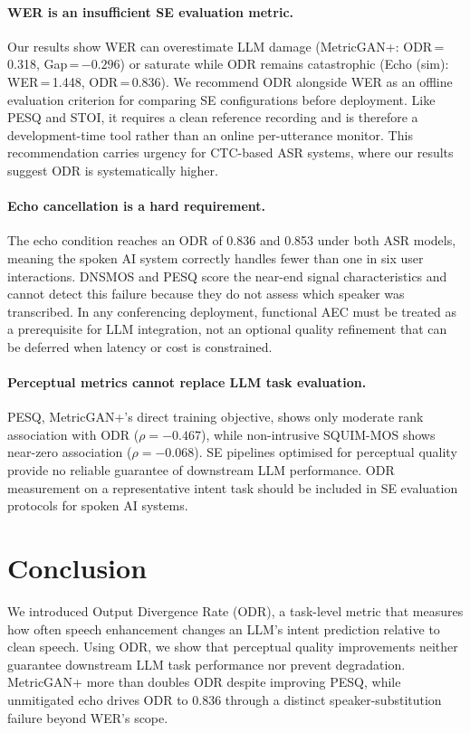 \documentclass[11pt]{article}
\begin{document}
\paragraph{WER is an insufficient SE evaluation metric.}
Our results show WER can overestimate LLM damage (MetricGAN{+}:
ODR\,=\,0.318, Gap\,=\,$-0.296$) or saturate while
ODR remains catastrophic (Echo (sim): WER\,=\,1.448,
ODR\,=\,0.836).
We recommend ODR alongside WER as an offline evaluation criterion
for comparing SE configurations before deployment. Like PESQ and
STOI, it requires a clean reference recording and is therefore
a development-time tool rather than an online per-utterance monitor.
This recommendation carries urgency for CTC-based ASR
systems, where our results suggest ODR is systematically higher.
 
\paragraph{Echo cancellation is a hard requirement.}
The echo condition reaches an ODR of 0.836 and 0.853 under both ASR
models, meaning the spoken AI system correctly handles fewer than one in six
user interactions.
DNSMOS and PESQ score the near-end signal characteristics and cannot
detect this failure because they do not assess which speaker was
transcribed.
In any conferencing deployment, functional AEC must be treated as a
prerequisite for LLM integration, not an optional quality refinement
that can be deferred when latency or cost is constrained.

\paragraph{Perceptual metrics cannot replace LLM task evaluation.}
PESQ, MetricGAN{+}'s direct training objective, shows only moderate
rank association with ODR ($\rho = -0.467$), while non-intrusive
SQUIM-MOS shows near-zero association ($\rho = -0.068$).
SE pipelines optimised for perceptual quality provide no reliable
guarantee of downstream LLM performance. ODR measurement on a
representative intent task should be included in SE evaluation
protocols for spoken AI systems.
\section{Conclusion}
\label{sec:conclusion}

We introduced Output Divergence Rate (ODR), a task-level metric that
measures how often speech enhancement changes an LLM's intent
prediction relative to clean speech. Using ODR, we show that
perceptual quality improvements neither guarantee downstream LLM task
performance nor prevent degradation. MetricGAN{+} more than doubles
ODR despite improving PESQ, while unmitigated echo drives ODR to 0.836
through a distinct speaker-substitution failure beyond WER's scope.
\end{document}
